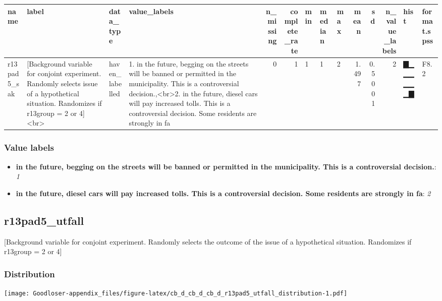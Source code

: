 \documentclass[
]{book}
\providecommand{\tightlist}{%
  \setlength{\itemsep}{0pt}\setlength{\parskip}{0pt}}
\begin{document}
\begin{tabular}{l|l|l|l|r|r|l|l|l|r|r|r|l|l}
\hline
name & label & data_type & value_labels & n_missing & complete_rate & min & median & max & mean & sd & n_value_labels & hist & format.spss\\
\hline
r13pad5_sak & [Background variable for conjoint experiment. Randomly selects issue of a hypothetical situation. Randomizes if r13group = 2 or 4]<br> & haven_labelled & 1. in the future, begging on the streets will be banned or permitted in the municipality. This is a controversial decision.,<br>2. in the future, diesel cars will pay increased tolls. This is a controversial decision. Some residents are strongly in fa & 0 & 1 & 1 & 1 & 2 & 1.497 & 0.5001 & 2 & ▇▁▁▁▁▁▁▇ & F8.2\\
\hline
\end{tabular}

\hypertarget{r13pad5_sak_labels}{%
\subsubsection{Value labels}\label{r13pad5_sak_labels}}

\begin{itemize}
\tightlist
\item
  \textbf{in the future, begging on the streets will be banned or permitted in the municipality. This is a controversial decision.}: \emph{1}
\item
  \textbf{in the future, diesel cars will pay increased tolls. This is a controversial decision. Some residents are strongly in fa}: \emph{2}
\end{itemize}

\hypertarget{r13pad5_utfall}{%
\subsection{r13pad5\_utfall}\label{r13pad5_utfall}}

{[}Background variable for conjoint experiment. Randomly selects the outcome of the issue of a hypothetical situation. Randomizes if r13group = 2 or 4{]}

\hypertarget{r13pad5_utfall_distribution}{%
\subsubsection{Distribution}\label{r13pad5_utfall_distribution}}

\texttt{[image: Goodloser-appendix\_files/figure-latex/cb\_d\_cb\_d\_cb\_d\_r13pad5\_utfall\_distribution-1.pdf]}
\end{document}
